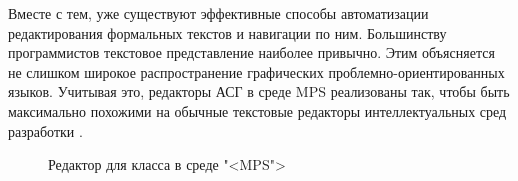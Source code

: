 Вместе с тем, уже существуют эффективные способы автоматизации редактирования формальных текстов и навигации по ним. Большинству программистов текстовое представление наиболее привычно. Этим объясняется не слишком широкое распространение графических проблемно-ориентированных языков. Учитывая это, редакторы АСГ в среде MPS реализованы так, чтобы быть максимально похожими на обычные текстовые редакторы интеллектуальных сред разработки \pic{\ref{fig:ClassInMPS}}.

\begin{figure}
\centering
{}
\caption{Редактор для класса в среде "<MPS">}
\label{fig:ClassInMPS}
\end{figure}
